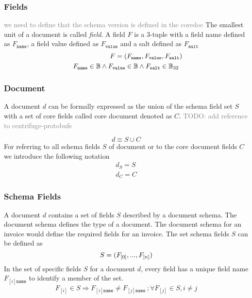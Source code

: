 \subsubsection{Fields}
\textcolor{gray}{we need to define that the schema version is defined in the coredoc}
The smallest unit of a document is called \textit{field}.  
A field $F$ is a 3-tuple  with a field name defined as $F_\texttt{name}$, a field value defined as $F_\texttt{value}$ and a salt defined as $F_\texttt{salt}$
\begin{eqnarray}
F = (F_\texttt{name},F_\texttt{value},F_\texttt{salt}) \\
\begin{array}[t]{lclclc}
F_{\texttt{name}} \in \mathbb{B} \wedge F_{\texttt{value}} \in \mathbb{B} \wedge  F_{\texttt{salt}} \in \mathbb{B}_{32} \\
\end{array}
\end{eqnarray}


\subsubsection{Document}
A document $d$  can be formally expressed as the union of the schema field set $S$ with a set of core fields called core document denoted as $C$.
\textcolor{gray}{TODO: add reference to centrifuge-protobufs}

\begin{equation}
d \equiv S \cup  C
\end{equation}
For referring to all schema fields $S$ of document or to the core document fields $C$ we introduce the following notation
\begin{eqnarray}
d_S = S \\
d_C = C
\end{eqnarray}

\subsubsection{Schema Fields}\label{sec:doc_schema_fields}
A document $d$ contains a set of fields $S$ described by a document schema. The document schema defines the type of a document. The document schema for an invoice would define the required fields for an invoice.
The set schema fields $S$ can be defined as
\begin{equation}
S = (F_{[0]},...,F_{[n]})\\
\end{equation}
In the set of specific fields $S$ for a document $d$, every field has a unique field name $F_{[i]\texttt{name}}$ to identify a member of the set.
\begin{equation}
F_{[i]} \in  S \Rightarrow F_{[i]\texttt{name}} \neq  F_{[j]\texttt{name}} \, ; \forall F_{[j]}  \in S, i \neq j 
\end{equation}

